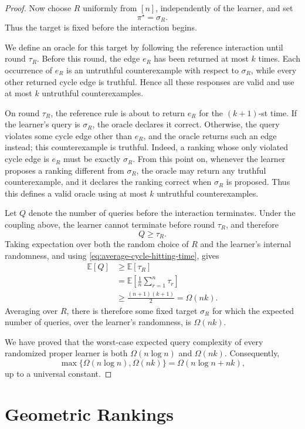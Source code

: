 \documentclass[11pt]{article}
\theoremstyle{definition}
\theoremstyle{remark}
\begin{document}
\begin{proof}
Now choose $R$ uniformly from $[n]$, independently of the learner, and set
\[
    \pi^\star=\sigma_R.
\]
Thus the target is fixed before the interaction begins.

We define an oracle for this target by following the reference interaction
until round $\tau_R$. Before this round, the edge $e_R$ has been returned
at most $k$ times. Each occurrence of $e_R$ is an untruthful counterexample
with respect to $\sigma_R$, while every other returned cycle edge is
truthful. Hence all these responses are valid and use at most $k$
untruthful counterexamples.

On round $\tau_R$, the reference rule is about to return $e_R$ for the
$(k+1)$-st time. If the learner's query is $\sigma_R$, the oracle declares
it correct. Otherwise, the query violates some cycle edge other than
$e_R$, and the oracle returns such an edge instead; this counterexample is
truthful. Indeed, a ranking whose only violated cycle edge is $e_R$ must be
exactly $\sigma_R$. From this point on, whenever the learner proposes a
ranking different from $\sigma_R$, the oracle may return any truthful
counterexample, and it declares the ranking correct when $\sigma_R$ is
proposed. Thus this defines a valid oracle using at most $k$ untruthful
counterexamples.

Let $Q$ denote the number of queries before the interaction terminates.
Under the coupling above, the learner cannot terminate before round
$\tau_R$, and therefore
\[
    Q\geq\tau_R.
\]
Taking expectation over both the random choice of $R$ and the learner's
internal randomness, and using \eqref{eq:average-cycle-hitting-time}, gives
\[
\begin{aligned}
    \mathbb E[Q]
    &\geq \mathbb E[\tau_R] \\
    &= \mathbb E\left[\frac1n\sum_{r=1}^n\tau_r\right] \\
    &\geq \frac{(n+1)(k+1)}2
    = \Omega(nk).
\end{aligned}
\]
Averaging over $R$, there is therefore some fixed target $\sigma_R$ for
which the expected number of queries, over the learner's randomness, is
$\Omega(nk)$.

We have proved that the worst-case expected query complexity of every
randomized proper learner is both $\Omega(n\log n)$ and $\Omega(nk)$.
Consequently,
\[
    \max\{\Omega(n\log n),\Omega(nk)\}
    =
    \Omega(n\log n+nk),
\]
up to a universal constant.
\end{proof}

\section{Geometric Rankings}
\label{sec:geometric-rankings}
\end{document}
